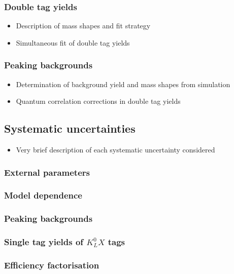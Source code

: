 \documentclass[12pt, a4paper, notitlepage, onecolumn]{article}
\begin{document}
\subsubsection{Double tag yields}
  \begin{itemize}[nosep]
    \setlength{\itemindent}{2.5em}
    \item[\textasteriskcentered]{Description of mass shapes and fit strategy}
    \item[\textasteriskcentered]{Simultaneous fit of double tag yields}
  \end{itemize}
\subsubsection{Peaking backgrounds}
  \begin{itemize}[nosep]
    \setlength{\itemindent}{2.5em}
    \item[\textasteriskcentered]{Determination of background yield and mass shapes from simulation}
    \item[\textasteriskcentered]{Quantum correlation corrections in double tag yields}
  \end{itemize}
\subsection{Systematic uncertainties}
  \begin{itemize}[nosep]
    \setlength{\itemindent}{2em}
    \item[\textendash]{Very brief description of each systematic uncertainty considered}
  \end{itemize}
\subsubsection{External parameters}
\subsubsection{Model dependence}
\subsubsection{Peaking backgrounds}
\subsubsection{Single tag yields of \texorpdfstring{$K^0_LX$}{KLX} tags}
\subsubsection{Efficiency factorisation}
\end{document}
